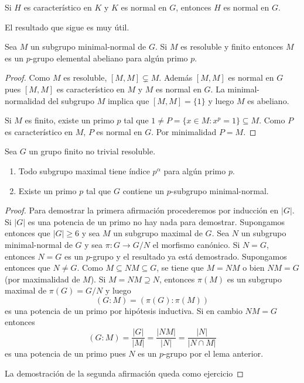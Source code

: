 \begin{exercise}
    Si $H$ es característico en $K$ y $K$ es normal en $G$, entonces 
    $H$ es normal en $G$. 
\end{exercise}

El resultado que sigue es muy útil. 

\begin{lemma}
	\label{lemma:minimal_normal}
	Sea $M$ un subgrupo minimal-normal de $G$. Si $M$ es resoluble y finito
	entonces $M$ es un $p$-grupo elemental abeliano para algún primo $p$.
\end{lemma}

\begin{proof}
	Como $M$ es resoluble, $[M,M]\subsetneq M$. Además $[M,M]$ es normal en $G$
	pues $[M,M]$ es característico en $M$ y $M$ es normal en $G$. La 
	minimal-normalidad del subgrupo $M$ implica que $[M,M]=\{1\}$ y luego $M$ es abeliano. 
	
	Si $M$ es finito, existe un primo $p$ tal que $1\ne P=\{x\in
	M:x^p=1\}\subseteq M$.  Como $P$ es característico en $M$, $P$ es normal en
	$G$. Por minimalidad $P=M$.
\end{proof}

\begin{theorem}
	Sea $G$ un grupo finito no trivial resoluble. 
	\begin{enumerate}
		\item Todo subgrupo maximal tiene índice $p^\alpha$ para algún primo $p$. 
		\item Existe un primo $p$ tal que $G$ contiene un $p$-subgrupo
			minimal-normal.
	\end{enumerate}
\end{theorem}

\begin{proof}
	Para demostrar la primera afirmación procederemos por inducción en $|G|$.
	Si $|G|$ es una potencia de un primo no hay nada para demostrar. Supongamos
	entonces que $|G|\geq6$ y sea $M$ un subgrupo maximal de $G$. Sea $N$ un
	subgrupo minimal-normal de $G$ y sea $\pi\colon G\to G/N$ el morfismo
	canónico.  Si $N=G$, entonces $N=G$ es un $p$-grupo y el resultado ya está demostrado. 
	Supongamos entonces que $N\ne G$. 
	Como $M\subseteq NM\subseteq G$,
	se tiene que $M=NM$ o bien $NM=G$ (por maximalidad de $M$).  Si
	$M=NM\supseteq N$, entonces $\pi(M)$ es un subgrupo maximal de $\pi(G)=G/N$
	y luego 
	\[
	(G:M)=(\pi(G):\pi(M))
	\]
	es una potencia de un primo por hipótesis inductiva. 
	Si en cambio $NM=G$ entonces 
	\[
	(G:M)=\frac{|G|}{|M|}=\frac{|NM|}{|N|}=\frac{|N|}{|N\cap M|}
	\]
	es una potencia de un primo pues $N$ es un $p$-grupo por el
	lema anterior. 
	
	La demostración de la segunda afirmación queda como ejercicio
\end{proof}

